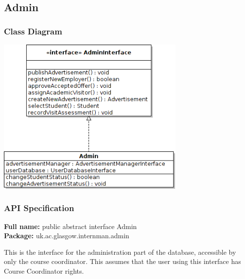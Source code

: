 \documentclass[11pt]{article}
\begin{document}
\newpage

\subsection{Admin}

\subsubsection{Class Diagram}
\begin{centering}
  \includegraphics[width=0.7\textwidth]{adminClassDiagram.png}
\end{centering}
\subsubsection{API Specification}

\textbf{Full name:} public abstract interface Admin\\

\textbf{Package:} uk.ac.glasgow.internman.admin

This is the interface for the administration part of the database, accessible by
only the course coordinator.
This assumes that the user using this interface has Course Coordinator
rights.
\end{document}

